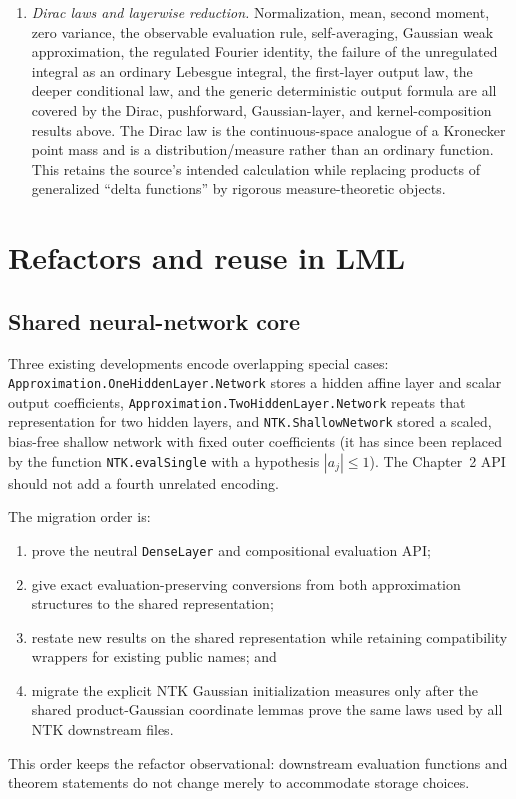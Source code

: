 \begin{enumerate}
  \item \emph{Dirac laws and layerwise reduction.}  Normalization, mean, second moment, zero
    variance, the observable evaluation rule, self-averaging, Gaussian weak approximation, the
    regulated Fourier identity, the failure of the unregulated integral as an ordinary Lebesgue
    integral, the first-layer output law, the deeper conditional law, and the generic deterministic
    output formula are all covered by the Dirac, pushforward, Gaussian-layer, and kernel-composition
    results above.  The Dirac law is the continuous-space analogue of a Kronecker point mass and is
    a distribution/measure rather than an ordinary function.  This retains the source's intended
    calculation while replacing products of generalized ``delta functions'' by rigorous
    measure-theoretic objects.
\end{enumerate}

\section{Refactors and reuse in LML}

\subsection{Shared neural-network core}

Three existing developments encode overlapping special cases:
\texttt{Approximation.OneHiddenLayer.Network} stores a hidden affine layer and scalar output
coefficients, \texttt{Approximation.TwoHiddenLayer.Network} repeats that representation for two
hidden layers, and \texttt{NTK.ShallowNetwork} stored a scaled, bias-free shallow network with
fixed outer coefficients (it has since been replaced by the function \texttt{NTK.evalSingle}
with a hypothesis $|a_j|\le1$).  The Chapter~2 API should not add a fourth unrelated encoding.

The migration order is:
\begin{enumerate}
  \item prove the neutral \texttt{DenseLayer} and compositional evaluation API;
  \item give exact evaluation-preserving conversions from both approximation structures to the
    shared representation;
  \item restate new results on the shared representation while retaining compatibility wrappers
    for existing public names; and
  \item migrate the explicit NTK Gaussian initialization measures only after the shared
    product-Gaussian coordinate lemmas prove the same laws used by all NTK downstream files.
\end{enumerate}
This order keeps the refactor observational: downstream evaluation functions and theorem
statements do not change merely to accommodate storage choices.

